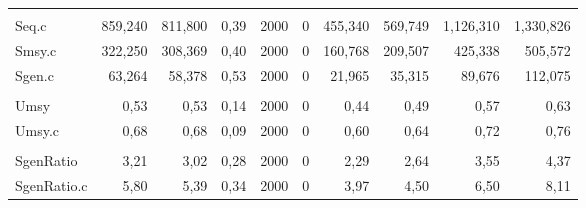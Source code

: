 \documentclass[french,11pt]{book}
\begin{document}
\begin{longtable}[t]{lrrrrrrrrr}
\midrule\\ Seq.c & 859,240 & 811,800 & 0,39 & 2000 & 0 & 455,340 & 569,749 & 1,126,310 & 1,330,826\\ Smsy.c & 322,250 & 308,369 & 0,40 & 2000 & 0 & 160,768 & 209,507 & 425,338 & 505,572\\ Sgen.c & 63,264 & 58,378 & 0,53 & 2000 & 0 & 21,965 & 35,315 & 89,676 & 112,075\\
\midrule\\ Umsy & 0,53 & 0,53 & 0,14 & 2000 & 0 & 0,44 & 0,49 & 0,57 & 0,63\\ Umsy.c & 0,68 & 0,68 & 0,09 & 2000 & 0 & 0,60 & 0,64 & 0,72 & 0,76\\
\midrule\\ SgenRatio & 3,21 & 3,02 & 0,28 & 2000 & 0 & 2,29 & 2,64 & 3,55 & 4,37\\ SgenRatio.c & 5,80 & 5,39 & 0,34 & 2000 & 0 & 3,97 & 4,50 & 6,50 & 8,11\\* \end{longtable}

\endgroup{} \endgroup{}
\end{document}
